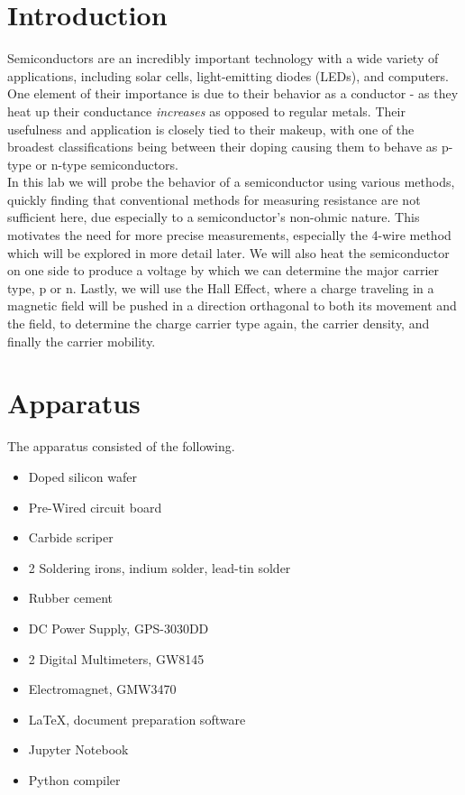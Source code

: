 \documentclass[aps,prl,reprint]{revtex4-2}
\begin{document}
\section{Introduction}
Semiconductors are an incredibly important technology with a wide variety of applications, 
including solar cells, light-emitting diodes (LEDs), and computers. One element of their 
importance is due to their behavior as a conductor - as they heat up their conductance 
\emph{increases} as opposed to regular metals. Their usefulness and application is closely 
tied to their makeup, with one of the broadest classifications being between their doping causing
them to behave as p-type or n-type semiconductors. \\

In this lab we will probe the behavior of a semiconductor using various methods, quickly
finding that conventional methods for measuring resistance are not sufficient here, due especially
to a semiconductor's non-ohmic nature. This motivates the need for more precise measurements,
especially the 4-wire method which will be explored in more detail later. We will also heat the
semiconductor on one side to produce a voltage by which we can determine the major carrier type, 
p or n. Lastly, we will use the Hall Effect, where a charge traveling in a magnetic field 
will be pushed in a direction orthagonal to both its movement and the field, to determine the
charge carrier type again, the carrier density, and finally the carrier mobility. 

\section{Apparatus}

The apparatus consisted of the following.

\begin{itemize}
	\item Doped silicon wafer
	\item Pre-Wired circuit board
	\item Carbide scriper
	\item 2 Soldering irons, indium solder, lead-tin solder
	\item Rubber cement
	\item DC Power Supply, GPS-3030DD
	\item 2 Digital Multimeters, GW8145
	\item Electromagnet, GMW3470
	\item LaTeX, document preparation software
	\item Jupyter Notebook
	\item Python compiler
\end{itemize}
\end{document}
